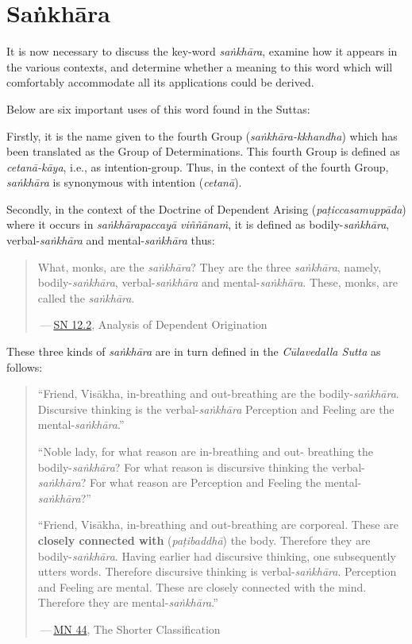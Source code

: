 \chapter{Saṅkhāra}

It is now necessary to discuss the key-word \emph{saṅkhāra}, examine how it appears in the various contexts, and determine whether a meaning to this word which will comfortably accommodate all its applications could be derived.

Below are six important uses of this word found in the Suttas:

Firstly, it is the name given to the fourth Group (\emph{saṅkhāra-kkhandha}) which has been translated as the Group of Determinations. This fourth Group is defined as \emph{cetanā-kāya}, i.e., as intention-group. Thus, in the context of the fourth Group, \emph{saṅkhāra} is synonymous with intention (\emph{cetanā}).

Secondly, in the context of the Doctrine of Dependent Arising (\emph{paṭiccasamuppāda}) where it occurs in \emph{saṅkhārapaccayā viññānaṁ}, it is defined as bodily-\emph{saṅkhāra}, verbal-\emph{saṅkhāra} and mental-\emph{saṅkhāra} thus:

\begin{quote}
What, monks, are the \emph{saṅkhāra}? They are the three \emph{saṅkhāra}, namely, bodily-\emph{saṅkhāra}, verbal-\emph{saṅkhāra} and mental-\emph{saṅkhāra}. These, monks, are called the \emph{saṅkhāra}.

 --- \href{https://suttacentral.net/sn12.2/en/bodhi}{SN 12.2}, Analysis of Dependent Origination
\end{quote}

These three kinds of \emph{saṅkhāra} are in turn defined in the \emph{Cūlavedalla Sutta} as follows:

\begin{quote}
``Friend, Visākha, in-breathing and out-breathing are the bodily-\emph{saṅkhāra}. Discursive thinking is the verbal-\emph{saṅkhāra} Perception and Feeling are the mental-\emph{saṅkhāra}.''

``Noble lady, for what reason are in-breathing and out- breathing the bodily-\emph{saṅkhāra}? For what reason is discursive thinking the verbal-\emph{saṅkhāra}? For what reason are Perception and Feeling the mental-\emph{saṅkhāra}?''

``Friend, Visākha, in-breathing and out-breathing are corporeal. These are \textbf{closely connected with} (\emph{paṭibaddhā}) the body. Therefore they are bodily-\emph{saṅkhāra}. Having earlier had discursive thinking, one subsequently utters words. Therefore discursive thinking is verbal-\emph{saṅkhāra}. Perception and Feeling are mental. These are closely connected with the mind. Therefore they are mental-\emph{saṅkhāra}.''

 --- \href{https://suttacentral.net/mn44/en/sujato}{MN 44}, The Shorter Classification
\end{quote}

